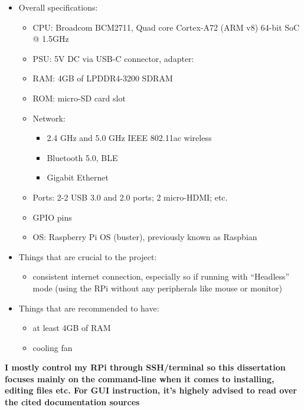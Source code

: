 \begin{itemize}
\tightlist
\item
  Overall specifications:

  \begin{itemize}
  \tightlist
  \item
    CPU: Broadcom BCM2711, Quad core Cortex-A72 (ARM v8) 64-bit SoC @
    1.5GHz
  \item
    PSU: 5V DC via USB-C connector, adapter:
  \item
    RAM: 4GB of LPDDR4-3200 SDRAM
  \item
    ROM: micro-SD card slot
  \item
    Network:

    \begin{itemize}
    \tightlist
    \item
      2.4 GHz and 5.0 GHz IEEE 802.11ac wireless
    \item
      Bluetooth 5.0, BLE
    \item
      Gigabit Ethernet
    \end{itemize}
  \item
    Ports: 2-2 USB 3.0 and 2.0 ports; 2 micro-HDMI; etc.
  \item
    GPIO pins
  \item
    OS: Raspberry Pi OS (buster), previously known as Raspbian
  \end{itemize}
\item
  Things that are crucial to the project:

  \begin{itemize}
  \tightlist
  \item
    consistent internet connection, especially so if running with
    ``Headless'' mode (using the RPi without any peripherals like mouse
    or monitor)
  \end{itemize}
\item
  Things that are recommended to have:

  \begin{itemize}
  \tightlist
  \item
    at least 4GB of RAM
  \item
    cooling fan
  \end{itemize}
\end{itemize}

\textbf{I mostly control my RPi through SSH/terminal so this
dissertation focuses mainly on the command-line when it comes to
installing, editing files etc. For GUI instruction, it's highely advised
to read over the cited documentation sources}

